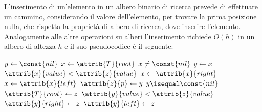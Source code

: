 L'inserimento di un'elemento in un albero binario di ricerca prevede di effettuare
un cammino, considerando il valore dell'elemento, per trovare la prima posizione
nulla, che rispetta la proprietà di albero di ricerca, dove inserire l'elemento.\newline
Analogamente alle altre operazioni su alberi l'inserimento richiede $O(h)$ in un albero
di altezza $h$ e il suo pseudocodice è il seguente:
\begin{codebox}
\li $ y \gets \const{nil}$
\li $ x \gets \attrib{T}{root}$
\li \While $ x \neq \const{nil}$
    \Do
\li            $ y \gets x $
\li            \If $\attrib{x}{value} < \attrib{z}{value}$
               \Then
\li                           $ x \gets \attrib{x}{right}$
\li            \Else $x \gets \attrib{x}{left}$
    \End
\li $\attrib{z}{p} \gets y$
\li \If $y \isequal \const{nil}$
    \Then
\li        $\attrib{T}{root} \gets z$
\li \ElseIf $\attrib{y}{value} < \attrib{z}{value}$
    \Then
\li                  $\attrib{y}{right} \gets z$
\li \Else $\attrib{y}{left} \gets z$
\end{codebox}



